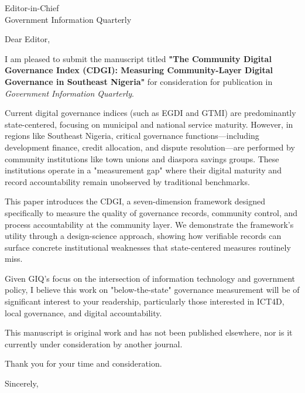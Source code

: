 \documentclass[12pt]{letter}
\begin{document}
\begin{letter}{Editor-in-Chief \\ Government Information Quarterly}

\opening{Dear Editor,}

I am pleased to submit the manuscript titled \textbf{"The Community Digital Governance Index (CDGI): Measuring Community-Layer Digital Governance in Southeast Nigeria"} for consideration for publication in \textit{Government Information Quarterly}.

Current digital governance indices (such as EGDI and GTMI) are predominantly state-centered, focusing on municipal and national service maturity. However, in regions like Southeast Nigeria, critical governance functions—including development finance, credit allocation, and dispute resolution—are performed by community institutions like town unions and diaspora savings groups. These institutions operate in a "measurement gap" where their digital maturity and record accountability remain unobserved by traditional benchmarks.

This paper introduces the CDGI, a seven-dimension framework designed specifically to measure the quality of governance records, community control, and process accountability at the community layer. We demonstrate the framework’s utility through a design-science approach, showing how verifiable records can surface concrete institutional weaknesses that state-centered measures routinely miss.

Given GIQ's focus on the intersection of information technology and government policy, I believe this work on "below-the-state" governance measurement will be of significant interest to your readership, particularly those interested in ICT4D, local governance, and digital accountability.

This manuscript is original work and has not been published elsewhere, nor is it currently under consideration by another journal.

Thank you for your time and consideration.

\closing{Sincerely,}

\end{letter}
\end{document}
